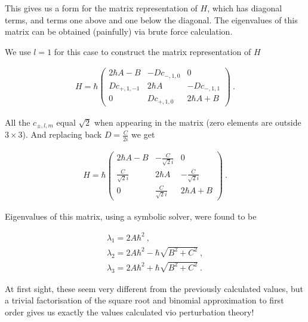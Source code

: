 This gives us a form for the matrix representation of $H$, which has diagonal
terms, and terms one above and one below the diagonal. The eigenvalues of this
matrix can be obtained (painfully) via brute force calculation.

We use $l = 1$ for this case to construct the matrix representation of $H$

\begin{align}
    H = \hbar \begin{pmatrix}
        2\hbar A - B    & -Dc_{-, 1,0}       & 0             \\   
        Dc_{+, 1,-1}    & 2\hbar A          & -Dc_{-, 1,1}   \\   
        0               & Dc_{+, 1,0}       & 2\hbar A + B    
    \end{pmatrix}~.
\end{align}

All the $c_{\pm, l,m}$ equal $\sqrt{2}$ when appearing in the matrix (zero
elements are outside $3\times 3$). And replacing back $D = \frac{C}{2i}$ we get

\begin{align}
    H = \hbar \begin{pmatrix}
        2\hbar A - B        & -\frac{C}{\sqrt{2}i}       & 0                     \\   
        \frac{C}{\sqrt{2}i} & 2\hbar A                  & -\frac{C}{\sqrt{2}i}   \\   
        0                   & \frac{C}{\sqrt{2}i}       & 2\hbar A + B    
    \end{pmatrix}~.
\end{align}

Eigenvalues of this matrix, using a symbolic solver, were found to be 

\begin{gather}
    \lambda_1 = 2 A \hbar^2~,\\
    \lambda_2 = 2 A \hbar^2 - \hbar\sqrt{B^2 + C^2}~,\\
    \lambda_3 = 2 A \hbar^2 + \hbar\sqrt{B^2 + C^2}~.
\end{gather}

At first sight, these seem very different from the previously calculated values,
but a trivial factorisation of the square root and binomial approximation to
first order gives us exactly the values calculated vio perturbation theory!